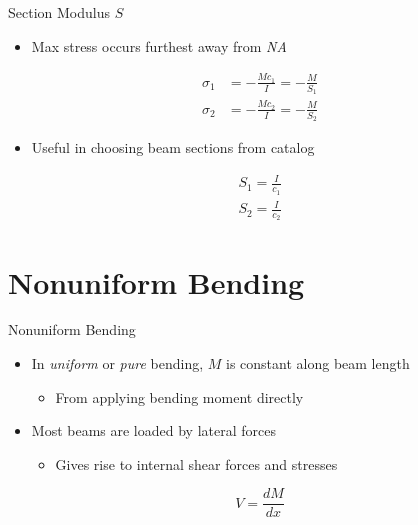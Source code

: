 \documentclass[10pt, svgnames]{beamer}
\begin{document}
\begin{frame}[label={sec:org077aed5}]{Section Modulus \(S\)}
\begin{itemize}
\item Max stress occurs furthest away from \emph{NA}
\end{itemize}

\begin{align*}
  \sigma_1 &= -\frac{Mc_1}{I} = -\frac{M}{S_1} \\
  \sigma_2 &= -\frac{Mc_2}{I} = -\frac{M}{S_2}
\end{align*}

\begin{itemize}
\item Useful in choosing beam sections from catalog
\end{itemize}

\begin{align*}
  S_{1} = \frac{I}{c_{1}} \\
  S_{2} = \frac{I}{c_{2}}
\end{align*}
\end{frame}

\section{Nonuniform Bending}
\label{nonuniform-bending}
\begin{frame}[label={sec:org467eaf4}]{Nonuniform Bending}
\begin{itemize}
\item In \emph{uniform} or \emph{pure} bending, \(M\) is constant along beam length

\begin{itemize}
\item From applying bending moment directly
\end{itemize}

\item Most beams are loaded by lateral forces

\begin{itemize}
\item Gives rise to internal shear forces and stresses
\end{itemize}
\end{itemize}

\[V = \frac{dM}{dx}\]
\end{frame}
\end{document}
